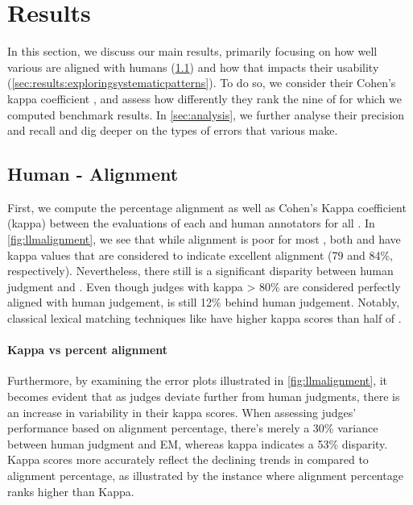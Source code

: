 \section{Results} \label{sec:results}

In this section, we discuss our main results, primarily focusing on how well various \judgemodels are aligned with humans (\cref{sec:results:exploringhumanjudgellmalignment}) and how that impacts their usability (\cref{sec:results:exploringsystematicpatterns}).
To do so, we consider their Cohen's kappa coefficient \citep{cohen1960kappa}, and assess how differently they rank the nine \evaluatormodels of for which we computed benchmark results.
In \cref{sec:analysis}, we further analyse their precision and recall and dig deeper on the types of errors that various \judgemodels make.

\subsection{Human - \JudgeModel Alignment}\label{sec:results:exploringhumanjudgellmalignment}

First, we compute the percentage alignment as well as Cohen's Kappa coefficient (kappa) between the evaluations of each \Judgemodels and human annotators for all \evaluatormodels. 
In \cref{fig:llmalignment}, we see that while alignment is poor for most \judgemodels, both  \citep{meta2024llama3} and  \citep{achiam2023gpt} have kappa values that are considered to indicate excellent alignment (79 and 84\%, respectively).
Nevertheless, there still is a significant disparity between human judgment and \judgemodels. 
Even though judges with kappa > 80\% are considered perfectly aligned with human judgement,  is still  12\% behind human judgement. 
Notably, classical lexical matching techniques like  have higher kappa scores than half of \judgemodels. 

\paragraph{Kappa vs percent alignment}
Furthermore, by examining the error plots illustrated in \cref{fig:llmalignment}, it becomes evident that as judges deviate further from human judgments, there is an increase in variability in their kappa scores. 
When assessing judges' performance based on alignment percentage, there's merely a 30\% variance between human judgment and EM, whereas kappa indicates a 53\% disparity. 
Kappa scores more accurately reflect the declining trends in \judgemodels compared to alignment percentage, as illustrated by the instance where alignment percentage ranks  higher than Kappa.

